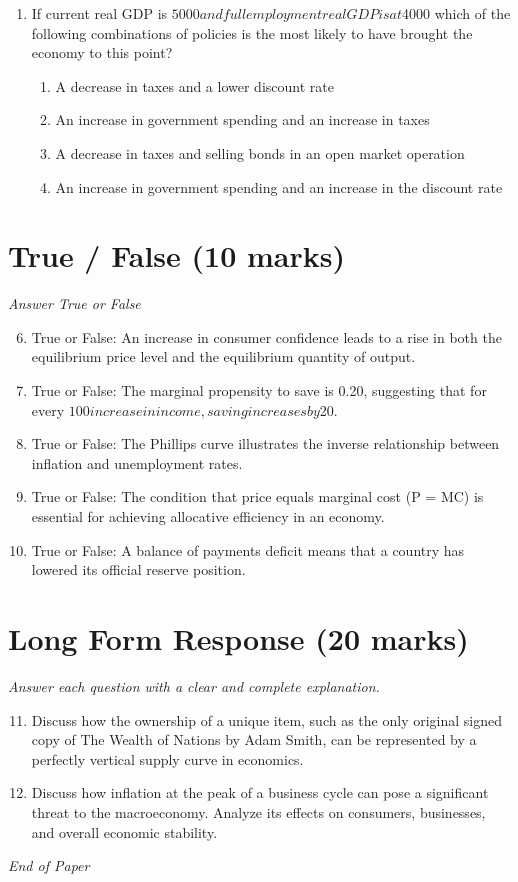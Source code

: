 \documentclass[12pt]{article}
\begin{document}
\begin{enumerate}[label=\arabic*.]
\begin{enumerate}[label=(\alph*)]
    \item diminishing returns to scale
\end{enumerate}
\item If current real GDP is $5000 and full employment real GDP is at $4000 which of the following combinations of policies is the most likely to have brought the economy to this point?
\begin{enumerate}[label=(\alph*)]
    \item A decrease in taxes and a lower discount rate
    \item An increase in government spending and an increase in taxes
    \item A decrease in taxes and selling bonds in an open market operation
    \item An increase in government spending and an increase in the discount rate
\end{enumerate}
\end{enumerate}

\section*{True / False (10 marks)}
\textit{Answer True or False}
\begin{enumerate}[label=\arabic*.]
\setcounter{enumi}{5}
\item True or False: An increase in consumer confidence leads to a rise in both the equilibrium price level and the equilibrium quantity of output.
\item True or False: The marginal propensity to save is 0.20, suggesting that for every $100 increase in income, saving increases by $20.
\item True or False: The Phillips curve illustrates the inverse relationship between inflation and unemployment rates.
\item True or False: The condition that price equals marginal cost (P = MC) is essential for achieving allocative efficiency in an economy.
\item True or False: A balance of payments deficit means that a country has lowered its official reserve position.
\end{enumerate}

\section*{Long Form Response (20 marks)}
\textit{Answer each question with a clear and complete explanation.}
\begin{enumerate}[label=\arabic*.]
\setcounter{enumi}{10}
\item Discuss how the ownership of a unique item, such as the only original signed copy of The Wealth of Nations by Adam Smith, can be represented by a perfectly vertical supply curve in economics.
\item Discuss how inflation at the peak of a business cycle can pose a significant threat to the macroeconomy. Analyze its effects on consumers, businesses, and overall economic stability.
\end{enumerate}

\vfill
\noindent\textit{End of Paper}
\end{document}
